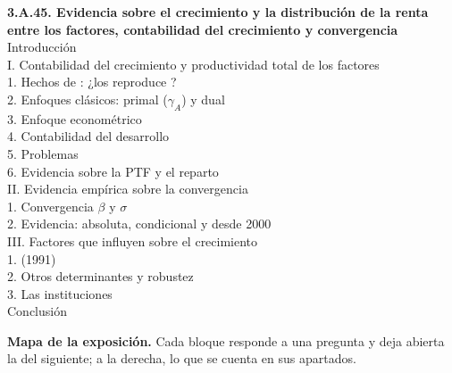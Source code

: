 \documentclass[11pt]{article}
\begin{document}
\begin{esquema}
\textbf{3.A.45. Evidencia sobre el crecimiento y la distribución de la renta entre los factores, contabilidad del crecimiento y convergencia}\\[2pt]
Introducción\\
I. Contabilidad del crecimiento y productividad total de los factores\\
\hspace*{1.5em}1. Hechos de : ¿los reproduce ?\\
\hspace*{1.5em}2. Enfoques clásicos: primal ($\gamma_A$) y dual\\
\hspace*{1.5em}3. Enfoque econométrico\\
\hspace*{1.5em}4. Contabilidad del desarrollo\\
\hspace*{1.5em}5. Problemas\\
\hspace*{1.5em}6. Evidencia sobre la PTF y el reparto\\
II. Evidencia empírica sobre la convergencia\\
\hspace*{1.5em}1. Convergencia $\beta$ y $\sigma$\\
\hspace*{1.5em}2. Evidencia: absoluta, condicional y desde 2000\\
III. Factores que influyen sobre el crecimiento\\
\hspace*{1.5em}1.  (1991)\\
\hspace*{1.5em}2. Otros determinantes y robustez\\
\hspace*{1.5em}3. Las instituciones\\
Conclusión
\end{esquema}

\begin{anotaciones}
\textbf{Mapa de la exposición.} Cada bloque responde a una pregunta y deja abierta la del siguiente; a la derecha, lo que se cuenta en sus apartados.
\begin{infografiacaja}
\caption{Mapa de la exposición: la pregunta de cada bloque y el hilo que los une}\label{figu:mapa-tema}
\end{infografiacaja}
\end{anotaciones}
\end{document}

